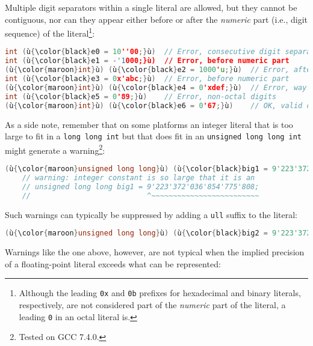 \noindent Multiple digit separators within a single literal are allowed, but they
cannot be contiguous, nor can they appear either before or after the
\emph{numeric} part (i.e., digit sequence) of the
literal{\cprotect\footnote{Although the leading \lstinline!0x! and
\lstinline!0b! prefixes for hexadecimal and binary literals,
respectively, are not considered part of the \emph{numeric} part of
  the literal, a leading \lstinline!0! in an octal literal is.}}:

\begin{lstlisting}[language=C++]
int (ù{\color{black}e0 = 10''00;}ù)  // Error, consecutive digit separators
int (ù{\color{black}e1 = -'1000;}ù)  // Error, before numeric part
(ù{\color{maroon}int}ù) (ù{\color{black}e2 = 1000'u;}ù)  // Error, after numeric part
int (ù{\color{black}e3 = 0x'abc;}ù)  // Error, before numeric part
(ù{\color{maroon}int}ù) (ù{\color{black}e4 = 0'xdef;}ù)  // Error, way before numeric part
int (ù{\color{black}e5 = 0'89;}ù)    // Error, non-octal digits
(ù{\color{maroon}int}ù) (ù{\color{black}e6 = 0'67;}ù)    // OK, valid octal literal
\end{lstlisting}
    
\noindent As a side note, remember that on some platforms an integer literal
that is too large to fit in a \lstinline!long!~\lstinline!long!~\lstinline!int! but that does fit in an
\lstinline!unsigned!~\lstinline!long!~\lstinline!long!~\lstinline!int! might
generate a warning{\cprotect\footnote{Tested on GCC 7.4.0.}}:

\begin{lstlisting}[language=C++]
(ù{\color{maroon}unsigned long long}ù) (ù{\color{black}big1 = 9'223'372'036'854'775'808;}ù)  // (ù{\codeincomments{2\^{}63}}ù)
    // warning: integer constant is so large that it is an
    // unsigned long long big1 = 9'223'372'036'854'775'808;
    //                           ^~~~~~~~~~~~~~~~~~~~~~~~~~
\end{lstlisting}
    
\noindent Such warnings can typically be suppressed by adding a \lstinline!ull!
suffix to the literal:

\begin{lstlisting}[language=C++]
(ù{\color{maroon}unsigned long long}ù) (ù{\color{black}big2 = 9'223'372'036'854'775'808ull;}ù)  // OK
\end{lstlisting}
    
\noindent Warnings like the one above, however, are not typical when the implied
precision of a floating-point literal exceeds what can be represented:

